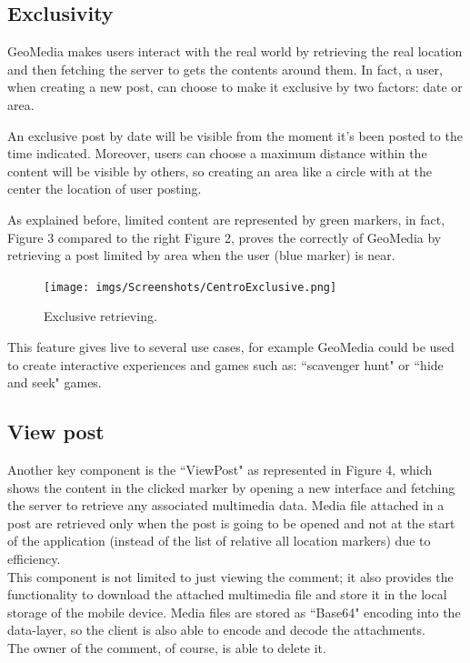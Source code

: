 \documentclass[conference]{IEEEtran}
\begin{document}
\subsection{Exclusivity}


GeoMedia makes users interact with the real world by retrieving the real location and then fetching the server to gets the contents around them.
In fact, a user, when creating a new post, can choose to make it exclusive by two factors: date or area.

An exclusive post by date will be visible from the moment it's been posted to the time indicated.
Moreover, users can choose a maximum distance within the content will be visible by others, so creating an area like a circle with at the center the location of user posting.

As explained before, limited content are represented by green markers, in fact, Figure 3 compared to the right Figure 2, proves the correctly of GeoMedia by retrieving a post limited by area when the user (blue marker) is near.

\begin{figure}[htbp]
\begin{center}
{\texttt{[image: imgs/Screenshots/CentroExclusive.png]}}
\end{center}
\caption{Exclusive retrieving.}
\label{fig}
\end{figure}


This feature gives live to several use cases, for example GeoMedia could be used to create interactive experiences and games such as: ``scavenger hunt" or ``hide and seek" games.


\subsection{View post}

Another key component is the ``ViewPost" as represented in Figure 4, which shows the content in the clicked marker by opening a new interface and fetching the server to retrieve any associated multimedia data.
Media file attached in a post are retrieved only when the post is going to be opened and not at the start of the application (instead of the list of relative all location markers) due  to efficiency.
\\
This component is not limited to just viewing the comment; it also provides the functionality to download the attached multimedia file and store it in the local storage of the mobile device.
Media files are stored as ``Base64" encoding into the data-layer, so the client is also able to encode and decode the attachments.
\\
The owner of the comment, of course, is able to delete it.
\end{document}

